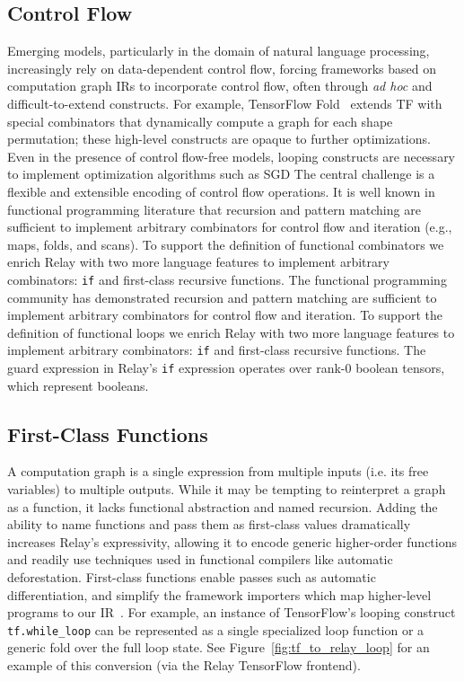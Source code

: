 \subsection*{Control Flow}

Emerging models, particularly in the domain of natural language processing, increasingly
  rely on data-dependent control flow, forcing frameworks based on computation graph IRs
  to incorporate control flow, often through \textit{ad hoc} and difficult-to-extend constructs.
For example, TensorFlow Fold~\citep{tf_fold} extends TF with special combinators that
  dynamically compute a graph for each shape permutation;
  these high-level constructs are opaque to further optimizations.
Even in the presence of control flow-free models, looping
  constructs are necessary to implement optimization algorithms
  such as SGD
The central challenge is a flexible and extensible encoding of
  control flow operations.
It is well known in functional programming literature that recursion and pattern matching are sufficient
  to implement arbitrary combinators for control flow and iteration (e.g., maps, folds, and scans).
To support the definition of functional combinators
  we enrich Relay with two more language
  features to implement arbitrary combinators: \verb|if| and first-class recursive functions.
The functional programming community has demonstrated recursion and pattern matching are sufficient
  to implement arbitrary combinators for control flow and iteration.
To support the definition of functional loops we enrich Relay with two more language
  features to implement arbitrary combinators: \verb|if| and first-class recursive functions.
The guard expression in Relay's \verb|if| expression operates over rank-0 boolean tensors,
  which represent booleans.

\subsection*{First-Class Functions}

A computation graph is a single expression
  from multiple inputs (i.e. its free variables) to multiple outputs.
While it may be tempting to reinterpret a graph as a function, it lacks functional abstraction
  and named recursion.
Adding the ability to name functions and pass them as first-class values dramatically increases
  Relay's expressivity, allowing it to encode generic
  higher-order functions and readily use techniques used in functional
  compilers like automatic deforestation.
First-class functions enable passes such as
  automatic differentiation, and simplify
  the framework importers which map higher-level programs to our IR~\citep{myia}.
For example, an instance of TensorFlow's looping construct \verb|tf.while_loop|
  can be represented as a single specialized loop function
  or a generic fold over the full loop state.
See Figure~\ref{fig:tf_to_relay_loop} for an example of this conversion (via
  the Relay TensorFlow frontend).

